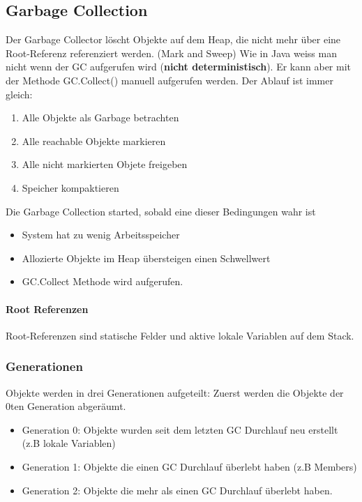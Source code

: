 \subsection{Garbage Collection}
Der Garbage Collector löscht Objekte auf dem Heap, die nicht mehr über eine Root-Referenz referenziert werden. (Mark and Sweep) Wie in Java weiss man nicht wenn der GC aufgerufen wird (\textbf{nicht deterministisch}). Er kann aber mit der Methode GC.Collect() manuell aufgerufen werden. Der Ablauf ist immer gleich:
\begin{enumerate}
	\item Alle Objekte als Garbage betrachten
	\item Alle reachable Objekte markieren
	\item Alle nicht markierten Objete freigeben
	\item Speicher kompaktieren
\end{enumerate}

Die Garbage Collection started, sobald eine dieser Bedingungen wahr ist
\begin{itemize}
	\item System hat zu wenig Arbeitsspeicher
	\item Allozierte Objekte im Heap übersteigen einen Schwellwert
	\item GC.Collect Methode wird aufgerufen.
\end{itemize}

\paragraph{Root Referenzen}
Root-Referenzen sind statische Felder und aktive lokale Variablen auf dem Stack.

\subsubsection{Generationen}
Objekte werden in drei Generationen aufgeteilt: Zuerst werden die Objekte der 0ten Generation abgeräumt.
\begin{itemize}
	\item Generation 0: Objekte wurden seit dem letzten GC Durchlauf neu erstellt (z.B lokale Variablen)
	\item Generation 1: Objekte die einen GC Durchlauf überlebt haben (z.B Members)
	\item Generation 2: Objekte die mehr als einen GC Durchlauf überlebt haben.
\end{itemize}


